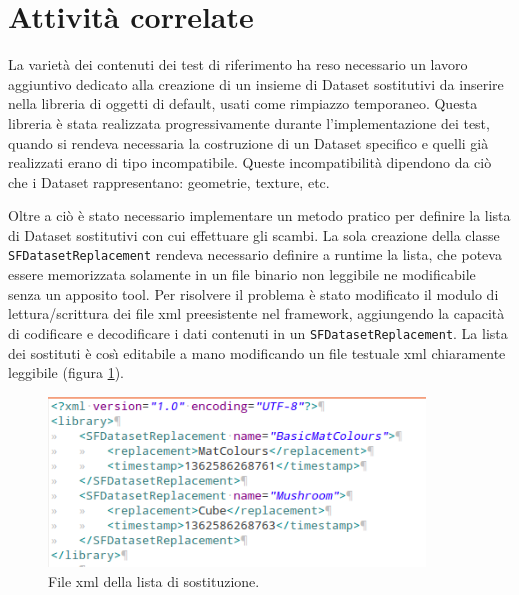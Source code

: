 \section{Attivit\`a correlate}
\label{sec:correlate}
La variet\`a dei contenuti dei test di riferimento ha reso necessario un lavoro aggiuntivo dedicato alla creazione di un insieme di Dataset sostitutivi da inserire nella libreria di oggetti di default, usati come rimpiazzo temporaneo.
Questa libreria \`e stata realizzata progressivamente durante l'implementazione dei test, quando si rendeva necessaria la costruzione di un Dataset specifico e quelli gi\`a realizzati erano di tipo incompatibile.
Queste incompatibilit\`a dipendono da ci\`o che i Dataset rappresentano: geometrie, texture, etc. 

Oltre a ci\`o \`e stato necessario implementare un metodo pratico per definire la lista di Dataset sostitutivi con cui effettuare gli scambi. La sola creazione della classe \texttt{SFDatasetReplacement} rendeva necessario definire a runtime la lista, che poteva essere memorizzata solamente in un file binario non leggibile ne modificabile senza un apposito tool. Per risolvere il problema \`e stato modificato il modulo di lettura/scrittura dei file xml preesistente nel framework, aggiungendo la capacit\`a di codificare e decodificare i dati contenuti in un \texttt{SFDatasetReplacement}. 
La lista dei sostituti \`e cos{\`\i} editabile a mano modificando un file testuale xml chiaramente leggibile (figura \ref{f:listaxml}).

\begin{figure}
\begin{center}
\includegraphics[width=10cm]{Immagini/listaxml}
\caption{File xml della lista di sostituzione.\label{f:listaxml}} 
\end{center} 
\end{figure}